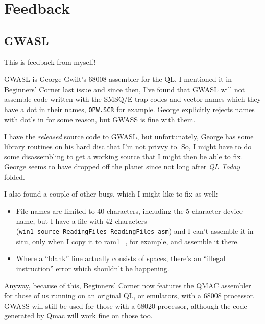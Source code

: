 
\chapter{Feedback}

\section{GWASL }

This is feedback from myself!

GWASL is George Gwilt's 68008 assembler for the QL, I mentioned it
in Beginners' Corner last issue and since then, I've found that GWASL
will not assemble code written with the SMSQ/E trap codes and vector
names which they have a dot in their names, \texttt{OPW.SCR} for example.
George explicitly rejects names with dot's in for some reason, but
GWASS is fine with them.

I have the \emph{released} source code to GWASL, but unfortunately,
George has some library routines on his hard disc that I'm not privvy
to. So, I might have to do some disassembling to get a working source
that I might then be able to fix. George seems to have dropped off
the planet since not long after \emph{QL Today} folded.

I also found a couple of other bugs, which I might like to fix as
well:
\begin{itemize}
\item File names are limited to 40 characters, including the 5 character
device name, but I have a file with 42 characters (\texttt{win1\_source\_ReadingFiles\_ReadingFiles\_asm})
and I can't assemble it in situ, only when I copy it to ram1\_, for
example, and assemble it there.
\item Where a ``blank'' line actually consists of spaces, there's an ``illegal
instruction'' error which shouldn't be happening.
\end{itemize}
Anyway, because of this, Beginners' Corner now features the QMAC assembler
for those of us running on an original QL, or emulators, with a 68008
processor. GWASS will still be used for those with a 68020 processor,
although the code generated by Qmac will work fine on those too.
